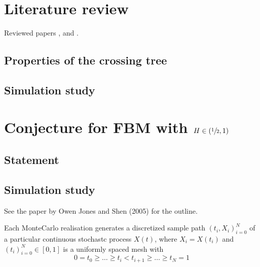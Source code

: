 \section{Literature review} %
\label{sec:literature_review}
Reviewed papers \cite{jones2004}, \cite{jonesshen2005} and \cite{decrouez2013}.


\subsection{Properties of the crossing tree} %
\label{sub:properties_of_the_crossing_tree}


\subsection{Simulation study} %
\label{sub:simulation_study_bm}



\section{Conjecture for FBM with $H\in (\sfrac{1}{2},1)$} %
\label{sec:conjecture_for_fbm}

\subsection{Statement} %
\label{sub:statement}


\subsection{Simulation study} %
\label{sub:simulation_study_fbm}

See the paper by Owen Jones and Shen (2005) for the outline.

Each MonteCarlo realisation generates a discretized sample path $(t_i, X_i)_{i=0}^N$ of
a particular continuous stochastc process $X(t)$, where $X_i = X(t_i)$ and $(t_i)_{i=0}^N\in [0,1]$
is a uniformly spaced mesh with
\[0 = t_0 \geq \ldots \geq t_i < t_{i+1} \geq \ldots \geq t_N = 1\]

